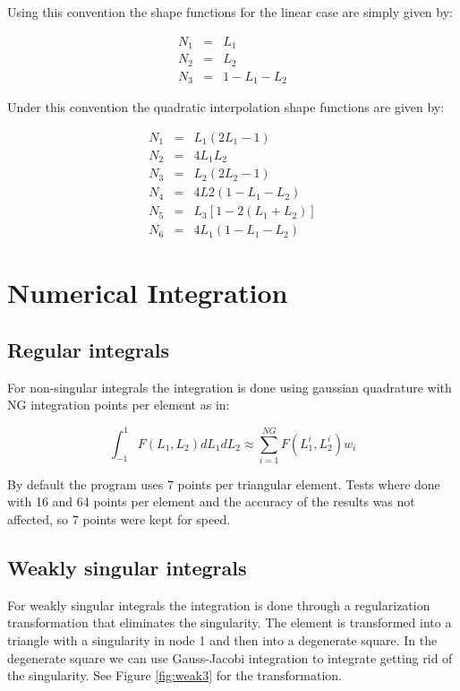 \documentclass[12pt]{report}
\begin{document}
Using this convention the shape functions for the linear case are simply given by:

\begin{eqnarray}
N_1 & = & L_1 \\
N_2 & = & L_2 \\
N_3 & = & 1-L_1-L_2
\end{eqnarray}

Under this convention the quadratic interpolation shape functions are given by:

\begin{eqnarray}
N_1 & = & L_1(2L_1-1) \\
N_2 & = & 4L_1L_2 \\
N_3 & = & L_2(2L_2-1) \\
N_4 & = & 4L2(1-L_1-L_2) \\
N_5 & = & L_3[1-2(L_1+L_2)] \\
N_6 & = & 4L_1(1-L_1-L_2)\end{eqnarray}

\pagebreak

\chapter{Numerical Integration}

\section{Regular integrals}
For non-singular integrals the integration is done using gaussian quadrature with NG integration points per element as in:

\begin{equation}
\int_{-1}^1{F(L_1,L_2)dL_1dL_2} \approx \sum_{i=1}^{NG}{F(L_1^i,L_2^i)w_i}
\end{equation}

By default the program uses 7 points per triangular element. Tests where done with 16 and 64 points per element and the accuracy of the results was not affected, so 7 points were kept for speed.

\section{Weakly singular integrals}
For weakly singular integrals the integration is done through a regularization transformation that eliminates the singularity. The element is transformed into a triangle with a singularity in node 1 and then into a degenerate square. In the degenerate square we can use Gauss-Jacobi integration to integrate getting rid of the singularity. See Figure \ref{fig:weak3} for the transformation.
\end{document}
